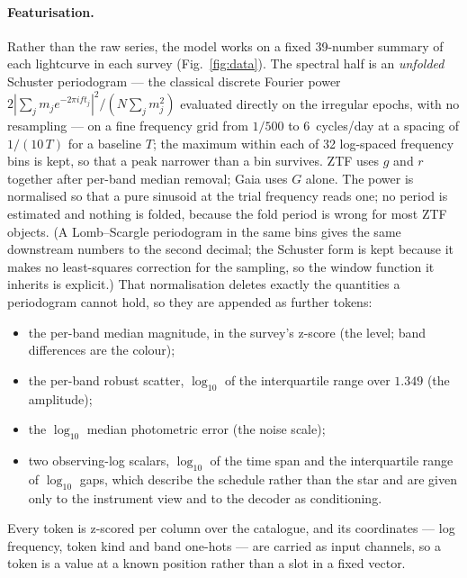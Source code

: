 \documentclass{article}
\begin{document}
\paragraph{Featurisation.}
Rather than the raw series, the model works on a fixed 39-number summary of each lightcurve in each survey (Fig.~\ref{fig:data}).
The spectral half is an \emph{unfolded} Schuster periodogram --- the classical discrete Fourier power $2|\sum_j m_j e^{-2\pi i f t_j}|^2/(N\sum_j m_j^2)$ evaluated directly on the irregular epochs, with no resampling --- on a fine frequency grid from $1/500$ to $6$~cycles/day at a spacing of $1/(10\,T)$ for a baseline $T$; the maximum within each of 32 log-spaced frequency bins is kept, so that a peak narrower than a bin survives.
ZTF uses $g$ and $r$ together after per-band median removal; Gaia uses $G$ alone.
The power is normalised so that a pure sinusoid at the trial frequency reads one; no period is estimated and nothing is folded, because the fold period is wrong for most ZTF objects. (A Lomb--Scargle periodogram in the same bins gives the same downstream numbers to the second decimal; the Schuster form is kept because it makes no least-squares correction for the sampling, so the window function it inherits is explicit.)
That normalisation deletes exactly the quantities a periodogram cannot hold, so they are appended as further tokens:
\begin{itemize}\itemsep0pt
\item the per-band median magnitude, in the survey's z-score (the level; band differences are the colour);
\item the per-band robust scatter, $\log_{10}$ of the interquartile range over $1.349$ (the amplitude);
\item the $\log_{10}$ median photometric error (the noise scale);
\item two observing-log scalars, $\log_{10}$ of the time span and the interquartile range of $\log_{10}$ gaps, which describe the schedule rather than the star and are given only to the instrument view and to the decoder as conditioning.
\end{itemize}
Every token is z-scored per column over the catalogue, and its coordinates --- log frequency, token kind and band one-hots --- are carried as input channels, so a token is a value at a known position rather than a slot in a fixed vector.
\end{document}
